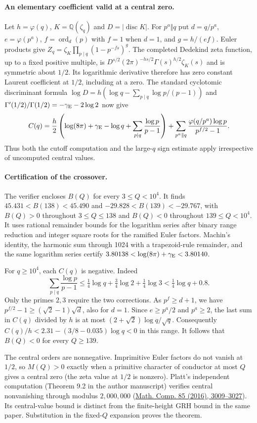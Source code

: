 \paragraph{An elementary coefficient valid at a central zero.}
Let $h=\varphi(q)$, $K=\mathbb Q(\zeta_q)$ and $D=|\operatorname{disc}K|$.
For $p^a\Vert q$ put $d=q/p^a$, $e=\varphi(p^a)$,
$f=\operatorname{ord}_d(p)$ with $f=1$ when $d=1$, and $g=h/(ef)$.
Euler products give $Z_q=\zeta_K\prod_{p\mid q}(1-p^{-fs})^g$.
The completed Dedekind zeta function, up to a fixed positive multiple,
is $D^{s/2}(2\pi)^{-hs/2}\Gamma(s)^{h/2}\zeta_K(s)$
and is symmetric about $1/2$. Its logarithmic derivative therefore has
zero constant Laurent coefficient at $1/2$, including at a zero.
The standard cyclotomic discriminant formula
$\log D=h(\log q-\sum_{p\mid q}\log p/(p-1))$
and $\Gamma'(1/2)/\Gamma(1/2)=-\gamma_{\rm E}-2\log2$ now give
\[
 C(q)=\frac{h}{2}\left(\log(8\pi)+\gamma_{\rm E}-\log q+
                         \sum_{p\mid q}\frac{\log p}{p-1}\right)
      +\sum_{p^a\Vert q}\frac{\varphi(q/p^a)\log p}{p^{f/2}-1}.
\]
Thus both the cutoff computation and the large-$q$ sign estimate apply
irrespective of uncomputed central values.

\paragraph{Certification of the crossover.}
The verifier 
encloses $B(Q)$ for every $3\le Q<10^4$. It finds
$45.431<B(138)<45.490$ and $-29.828<B(139)<-29.767$,
with $B(Q)>0$ throughout $3\le Q\le138$ and $B(Q)<0$ throughout
$139\le Q<10^4$. It uses rational remainder bounds for the logarithm
series after binary range reduction and integer square roots for the
ramified Euler factors. Machin's identity, the harmonic sum through 1024 with a trapezoid-rule
remainder, and the same logarithm series certify
$3.80138<\log(8\pi)+\gamma_{\rm E}<3.80140$.

For $q\ge10^4$, each $C(q)$ is negative. Indeed
\[
 \sum_{p\mid q}\frac{\log p}{p-1}
 \le\tfrac14\log q+\tfrac34\log2+\tfrac14\log3
 <\tfrac14\log q+0.8.
\]
Only the primes $2,3$ require the two corrections.
As $p^f\ge d+1$, we have
$p^{f/2}-1\ge(\sqrt2-1)\sqrt d$, also for $d=1$.
Since $e\ge p^a/2$ and $p^a\ge2$, the last sum in $C(q)$ divided by
$h$ is at most $(2+\sqrt2)\log q/\sqrt q$.
Consequently $C(q)/h<2.31-(3/8-0.035)\log q<0$ in this range.
It follows that $B(Q)<0$ for every $Q\ge139$.

The central orders are nonnegative. Imprimitive Euler factors do not
vanish at $1/2$, so $M(Q)>0$ exactly when a primitive character of
conductor at most $Q$ gives a central zero (the zeta value at $1/2$ is
nonzero). Platt's independent computation (Theorem 9.2 in the author manuscript)
verifies central nonvanishing
through modulus $2{,}000{,}000$
(\href{https://doi.org/10.1090/mcom/3077}{Math. Comp. 85 (2016), 3009--3027}).
Its central-value bound is distinct from the finite-height GRH bound in
the same paper. Substitution in the fixed-$Q$ expansion proves the theorem.


